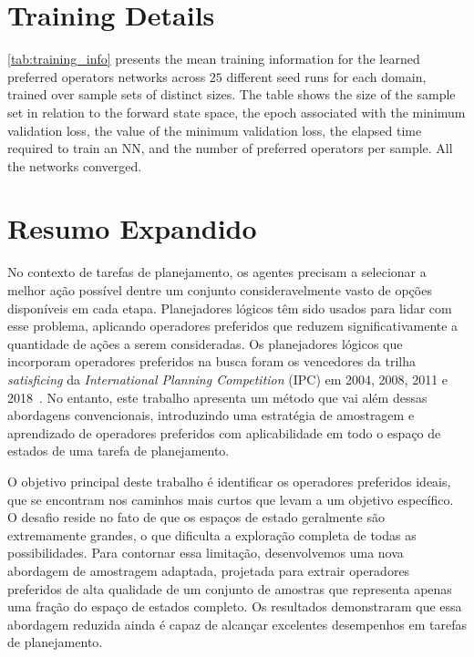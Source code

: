 \documentclass[ppgc,diss,english]{iiufrgs}
\begin{document}


\chapter{Training Details}
\cref{tab:training_info} presents the mean training information for the learned preferred operators \pog networks across $25$ different seed runs for each domain, trained over sample sets of distinct sizes. The table shows the size of the sample set in relation to the forward state space, the epoch associated with the minimum validation loss, the value of the minimum validation loss, the elapsed time required to train an NN, and the number of preferred operators per sample. All the networks converged.



\chapter{Resumo Expandido}
\noindent

No contexto de tarefas de planejamento, os agentes precisam a selecionar a melhor ação possível dentre um conjunto consideravelmente vasto de opções disponíveis em cada etapa. Planejadores lógicos têm sido usados para lidar com esse problema, aplicando operadores preferidos que reduzem significativamente a quantidade de ações a serem consideradas. Os planejadores lógicos que incorporam operadores preferidos na busca foram os vencedores da trilha \emph{satisficing} da \emph{International Planning Competition} (IPC) em 2004, 2008, 2011 e 2018~\cite{Helmert/2006,Richter.lama.etal/2011,Richter.lama.etal/2011,Seipp-fast.etal/2018}.
No entanto, este trabalho apresenta um método que vai além dessas abordagens convencionais, introduzindo uma estratégia de amostragem e aprendizado de operadores preferidos com aplicabilidade em todo o espaço de estados de uma tarefa de planejamento.

O objetivo principal deste trabalho é identificar os operadores preferidos ideais, que se encontram nos caminhos mais curtos que levam a um objetivo específico. O desafio reside no fato de que os espaços de estado geralmente são extremamente grandes, o que dificulta a exploração completa de todas as possibilidades. Para contornar essa limitação, desenvolvemos uma nova abordagem de amostragem adaptada, projetada para extrair operadores preferidos de alta qualidade de um conjunto de amostras que representa apenas uma fração do espaço de estados completo. Os resultados demonstraram que essa abordagem reduzida ainda é capaz de alcançar excelentes desempenhos em tarefas de planejamento.
\end{document}
